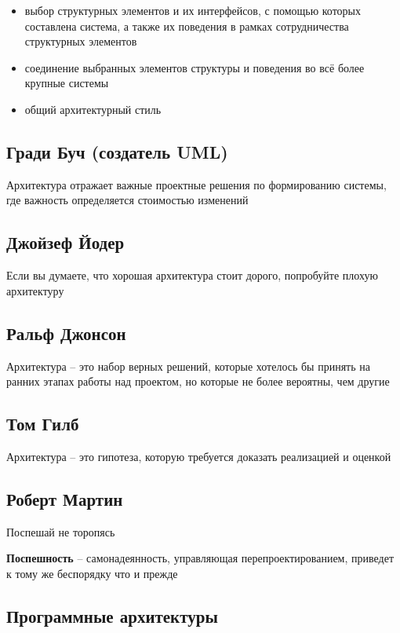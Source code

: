 \begin{itemize}
    \item выбор структурных элементов и их интерфейсов,
        с помощью которых составлена система, а также
        их поведения в рамках сотрудничества структурных
        элементов
    \item соединение выбранных элементов структуры и поведения
        во всё более крупные системы
    \item общий архитектурный стиль
\end{itemize}

\subsection{Гради Буч (создатель UML)}

Архитектура отражает важные проектные решения по формированию системы,
где важность определяется стоимостью изменений

\subsection{Джойзеф Йодер}

Если вы думаете, что хорошая архитектура стоит дорого, попробуйте
плохую архитектуру

\subsection{Ральф Джонсон}

Архитектура -- это набор верных решений, которые хотелось бы принять
на ранних этапах работы над проектом, но которые не более вероятны,
чем другие

\subsection{Том Гилб}

Архитектура -- это гипотеза, которую требуется доказать
реализацией и оценкой

\subsection{Роберт Мартин}

Поспешай не торопясь

\textbf{Поспешность} -- самонадеянность, управляющая
перепроектированием, приведет к тому же беспорядку что и прежде

\subsection{Программные архитектуры}

